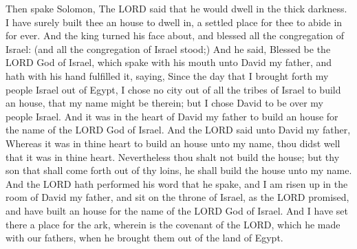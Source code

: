  Then spake Solomon, The LORD said that he would dwell in
the thick darkness.  I have surely built thee an house to
dwell in, a settled place for thee to abide in for ever. 
And the king turned his face about, and blessed all the congregation of
Israel: (and all the congregation of Israel stood;)  And he
said, Blessed be the LORD God of Israel, which spake with his mouth unto
David my father, and hath with his hand fulfilled it, saying,
 Since the day that I brought forth my people Israel out of
Egypt, I chose no city out of all the tribes of Israel to build an
house, that my name might be therein; but I chose David to be over my
people Israel.  And it was in the heart of David my father
to build an house for the name of the LORD God of Israel. 
And the LORD said unto David my father, Whereas it was in thine heart to
build an house unto my name, thou didst well that it was in thine heart.
 Nevertheless thou shalt not build the house; but thy son
that shall come forth out of thy loins, he shall build the house unto my
name.  And the LORD hath performed his word that he spake,
and I am risen up in the room of David my father, and sit on the throne
of Israel, as the LORD promised, and have built an house for the name of
the LORD God of Israel.  And I have set there a place for
the ark, wherein is the covenant of the LORD, which he made with our
fathers, when he brought them out of the land of Egypt.


